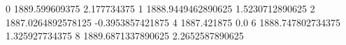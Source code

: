 0 1889.599609375 2.177734375
1 1888.9449462890625 1.5230712890625
2 1887.0264892578125 -0.3953857421875
4 1887.421875 0.0
6 1888.747802734375 1.325927734375
8 1889.6871337890625 2.2652587890625
